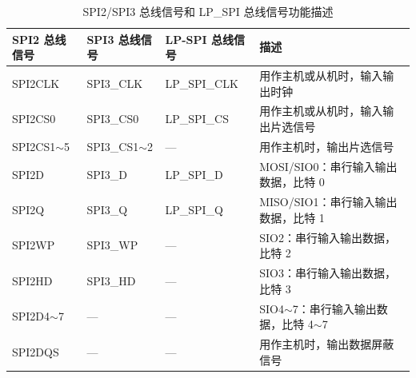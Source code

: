 \documentclass[main\_\_CN.tex]{subfiles}
\begin{document}
\begin{ThreePartTable}

\begin{longtable}[c]{|l|l|l|l|}    
\caption{SPI2/SPI3 总线信号和 LP\_SPI 总线信号功能描述}  
\label{table:SPI_signals}\\   
\hline     
    \rowcolor{lightgray} 
    \textbf{SPI2 总线信号}& \textbf{SPI3 总线信号}&  \textbf{LP-SPI 总线信号} & \textbf{描述} \\
    \hline 
    \endfirsthead
    
    \endlastfoot
    SPI2CLK     & SPI3\_CLK     & LP\_SPI\_CLK  & 用作主机或从机时，输入输出时钟 \\\hline
    SPI2CS0     & SPI3\_CS0     & LP\_SPI\_CS   & 用作主机或从机时，输入输出片选信号 \\\hline
    SPI2CS1$\sim$5 & SPI3\_CS1$\sim$2  & --- & 用作主机时，输出片选信号\\\hline    
    SPI2D       & SPI3\_D      & LP\_SPI\_D  & MOSI/SIO0：串行输入输出数据，比特 0\\
    \hline
    SPI2Q       & SPI3\_Q      & LP\_SPI\_Q & MISO/SIO1：串行输入输出数据，比特 1 \\\hline
    SPI2WP      & SPI3\_WP     & --- & SIO2：串行输入输出数据，比特 2 \\\hline
    SPI2HD      & SPI3\_HD     & --- & SIO3：串行输入输出数据，比特 3 \\\hline
    SPI2D4$\sim$7 &    ---  & ---  & SIO4$\sim$7：串行输入输出数据，比特 4$\sim$7 \\\hline
    SPI2DQS     & ---    & ---         & 用作主机时，输出数据屏蔽信号 \\\hline

\end{longtable}

\end{ThreePartTable}
\end{document}
